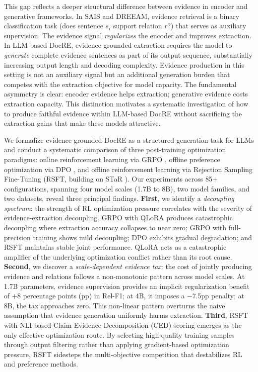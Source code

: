 This gap reflects a deeper structural difference between evidence in encoder and generative frameworks.
In SAIS and DREEAM, evidence retrieval is a binary classification task (does sentence $s_i$ support relation $r$?) that serves as auxiliary supervision.
The evidence signal \emph{regularizes} the encoder and improves extraction.
In LLM-based DocRE, evidence-grounded extraction requires the model to \emph{generate} complete evidence sentences as part of its output sequence, substantially increasing output length and decoding complexity.
Evidence production in this setting is not an auxiliary signal but an additional generation burden that competes with the extraction objective for model capacity.
The fundamental asymmetry is clear: encoder evidence helps extraction; generative evidence costs extraction capacity.
This distinction motivates a systematic investigation of how to produce faithful evidence within LLM-based DocRE without sacrificing the extraction gains that make these models attractive.

We formalize evidence-grounded DocRE as a structured generation task for LLMs and conduct a systematic comparison of three post-training optimization paradigms: online reinforcement learning via GRPO \citep{shao2024deepseekmath}, offline preference optimization via DPO \citep{rafailov2023direct}, and offline reinforcement learning via Rejection Sampling Fine-Tuning (RSFT, building on STaR \citep{zelikman2022star}).
Our experiments across 85+ configurations, spanning four model scales (1.7B to 8B), two model families, and two datasets, reveal three principal findings.
\textbf{First}, we identify a \emph{decoupling spectrum}: the strength of RL optimization pressure correlates with the severity of evidence-extraction decoupling.
GRPO with QLoRA \citep{hu2022lora} produces catastrophic decoupling where extraction accuracy collapses to near zero; GRPO with full-precision training shows mild decoupling; DPO exhibits gradual degradation; and RSFT maintains stable joint performance.
QLoRA acts as a catastrophic amplifier of the underlying optimization conflict rather than its root cause.
\textbf{Second}, we discover a \emph{scale-dependent evidence tax}: the cost of jointly producing evidence and relations follows a non-monotonic pattern across model scales.
At 1.7B parameters, evidence supervision provides an implicit regularization benefit of +8 percentage points (pp) in Rel-F1; at 4B, it imposes a $-$7.5pp penalty; at 8B, the tax approaches zero.
This non-linear pattern overturns the naive assumption that evidence generation uniformly harms extraction.
\textbf{Third}, RSFT with NLI-based Claim-Evidence Decomposition (CED) scoring emerges as the only effective optimization route.
By selecting high-quality training samples through output filtering rather than applying gradient-based optimization pressure, RSFT sidesteps the multi-objective competition that destabilizes RL and preference methods.

